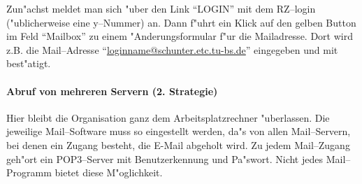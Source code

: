 Zun"achst meldet man sich "uber den Link "`LOGIN"' mit dem RZ--login
("ublicherweise eine y--Nummer) an. Dann f"uhrt ein Klick auf den gelben
Button im Feld "`Mailbox"' zu einem "Anderungsformular f"ur die
Mailadresse. Dort wird z.B. die Mail--Adresse
"`\url{loginname@schunter.etc.tu-bs.de}"' eingegeben und mit 
best"atigt.

\paragraph*{Abruf von mehreren Servern (2. Strategie)}

Hier bleibt die Organisation ganz dem Arbeitsplatzrechner "uberlassen. Die
jeweilige Mail--Software muss so eingestellt werden, da"s von allen
Mail--Servern, bei denen ein Zugang besteht, die \glossar E-Mail abgeholt
wird. Zu jedem Mail--Zugang geh"ort ein POP3--Server mit Benutzerkennung und
Pa"swort. Nicht jedes Mail--Programm bietet diese M"oglichkeit.
